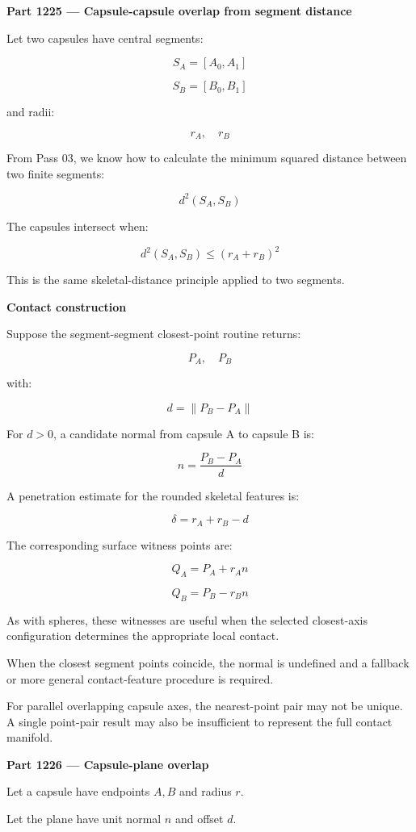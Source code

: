 \textbf{Part 1225 --- Capsule-capsule overlap from segment distance}

Let two capsules have central segments:

\[
S_A=[A_0,A_1]
\]

\[
S_B=[B_0,B_1]
\]

and radii:

\[
r_A,\quad r_B
\]

From Pass 03, we know how to calculate the minimum squared distance between two finite segments:

\[
d^2(S_A,S_B)
\]

The capsules intersect when:

\[
\boxed{ d^2(S_A,S_B)\le(r_A+r_B)^2 }
\]

This is the same skeletal-distance principle applied to two segments.

\textbf{Contact construction}

Suppose the segment-segment closest-point routine returns:

\[
P_A,\quad P_B
\]

with:

\[
d=\|P_B-P_A\|
\]

For \(d>0\), a candidate normal from capsule A to capsule B is:

\[
\boxed{ n=\frac{P_B-P_A}{d} }
\]

A penetration estimate for the rounded skeletal features is:

\[
\boxed{ \delta=r_A+r_B-d }
\]

The corresponding surface witness points are:

\[
Q_A=P_A+r_An
\]

\[
Q_B=P_B-r_Bn
\]

As with spheres, these witnesses are useful when the selected closest-axis configuration determines the appropriate local contact.

When the closest segment points coincide, the normal is undefined and a fallback or more general contact-feature procedure is required.

For parallel overlapping capsule axes, the nearest-point pair may not be unique. A single point-pair result may also be insufficient to represent the full contact manifold.

\textbf{Part 1226 --- Capsule-plane overlap}

Let a capsule have endpoints \(A,B\) and radius \(r\).

Let the plane have unit normal \(n\) and offset \(d\).


